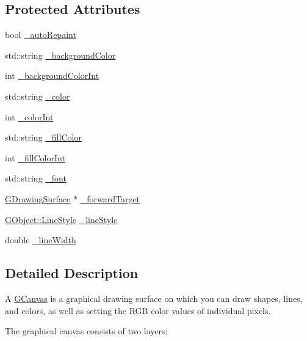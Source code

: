 \subsection*{Protected Attributes}
\begin{DoxyCompactItemize}
\item 
bool \mbox{\hyperlink{classGDrawingSurface_a738dd6afc69ac536ad46cf4d89a90933}{\+\_\+auto\+Repaint}}
\item 
std\+::string \mbox{\hyperlink{classGDrawingSurface_ad233544ea51cf6b435a199f3e3790607}{\+\_\+background\+Color}}
\item 
int \mbox{\hyperlink{classGDrawingSurface_abb8452ab4f23ecf455b9e021bf09ef91}{\+\_\+background\+Color\+Int}}
\item 
std\+::string \mbox{\hyperlink{classGDrawingSurface_a1134e770ae4315ea8bc1201e2f21da8b}{\+\_\+color}}
\item 
int \mbox{\hyperlink{classGDrawingSurface_a003fdd343d9b7505c53a8b7a134200ed}{\+\_\+color\+Int}}
\item 
std\+::string \mbox{\hyperlink{classGDrawingSurface_a179f8d6cee65cd8a54692e32b224392a}{\+\_\+fill\+Color}}
\item 
int \mbox{\hyperlink{classGDrawingSurface_a751def333a67d651e5b99cc331ecb496}{\+\_\+fill\+Color\+Int}}
\item 
std\+::string \mbox{\hyperlink{classGDrawingSurface_aea76ea1a8b5dd7b0a78653277e63b536}{\+\_\+font}}
\item 
\mbox{\hyperlink{classGDrawingSurface}{G\+Drawing\+Surface}} $\ast$ \mbox{\hyperlink{classGDrawingSurface_acbb02fa2a4a51a450fd1cc64dfc39ddd}{\+\_\+forward\+Target}}
\item 
\mbox{\hyperlink{classGObject_a86e0f5648542856159bb40775c854aa7}{G\+Object\+::\+Line\+Style}} \mbox{\hyperlink{classGDrawingSurface_ae15d02c66691247a6824dc5943a620e2}{\+\_\+line\+Style}}
\item 
double \mbox{\hyperlink{classGDrawingSurface_a16e9033665937f13de2e163dc2184aff}{\+\_\+line\+Width}}
\end{DoxyCompactItemize}


\subsection{Detailed Description}
A \mbox{\hyperlink{classGCanvas}{G\+Canvas}} is a graphical drawing surface on which you can draw shapes, lines, and colors, as well as setting the R\+GB color values of individual pixels. 

The graphical canvas consists of two layers\+:

